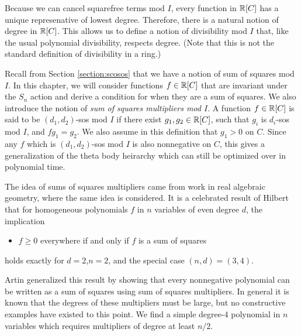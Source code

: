 Because we can cancel squarefree terms mod $I$, every function in $\mathbb{R}[C]$ has a unique represenative of lowest degree.
Therefore, there is a natural notion of degree in $\mathbb{R}[C]$.
This allows us to define a notion of divisibility mod $I$ that, like the usual polynomial divisibility, respects degree.
(Note that this is not the standard definition of divisibility in a ring.)

Recall from Section \ref{section:scosos} that we have a notion of sum of squares mod $I$.
In this chapter, we will consider functions $f \in \mathbb{R}[C]$ that are invariant under the $S_n$ action and derive a condition for when they are a sum of squares.
We also introduce the notion of {\em sum of squares multipliers mod $I$}. 
A function $f \in \mathbb{R}[C]$ is said to be $(d_1,d_2)$-sos mod $I$ if there exist $g_1,g_2 \in \mathbb{R}[C]$, such that $g_i$ is $d_i$-sos mod $I$, and $fg_1=g_2$.
We also assume in this definition that $g_1> 0$ on $C$.
Since any $f$ which is $(d_1,d_2)$-sos mod $I$ is also nonnegative on $C$, this gives a generalization of the theta body heirarchy which can still be optimized over in polynomial time.

The idea of sums of squares multipliers came from work in real algebraic geometry, where the same idea is considered.
It is a celebrated result of Hilbert \cite{hilbert} that for homogeneous polynomials $f$ in $n$ variables of even degree $d$, the implication
\begin{itemize}
\item $f \ge 0$ everywhere if and only if $f$ is a sum of squares
\end{itemize}
holds exactly for $d=2$,$n=2$, and the special case $(n,d)=(3,4)$.

Artin \cite{artin} generalized this result by showing that every nonnegative polynomial can be written as a sum of squares using sum of squares multipliers.
In general it is known that the degrees of these multipliers must be large, but no constructive examples have existed to this point.
We find a simple degree-4 polynomial in $n$ variables which requires multipliers of degree at least $n/2$.

